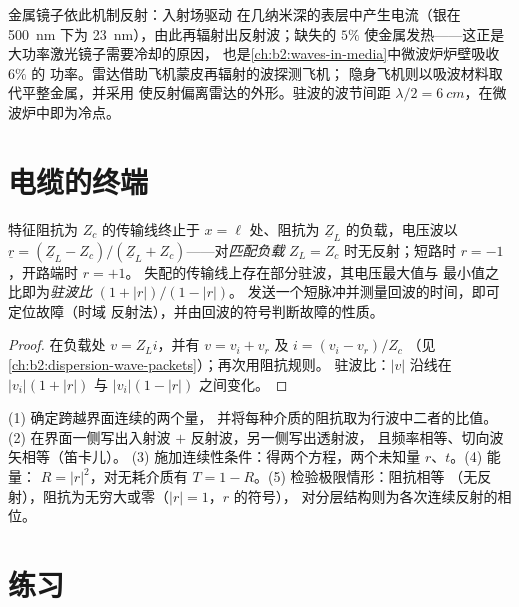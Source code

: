 \begin{example}[镜子、雷达与微波炉]\label{ex:b2:wave-interfaces:conductoruses}
金属镜子依此机制反射：入射场驱动
在几纳米深的表层中产生电流（银在
\qty{500}{nm} 下为 \qty{23}{nm}），由此再辐射出反射波；缺失的 $5\%$
使金属发热——这正是大功率激光镜子需要冷却的原因，
也是\cref{ch:b2:waves-in-media}中微波炉炉壁吸收 $6\%$ 的
功率。雷达借助飞机蒙皮再辐射的波探测飞机；
隐身飞机则以吸波材料取代平整金属，并采用
使反射偏离雷达的外形。驻波的波节间距 $\lambda/2 =
\qty{6}{cm}$，在微波炉中即为冷点。
\end{example}

\section{电缆的终端}

\begin{proposition}[传输线的终端]\label{prop:b2:wave-interfaces:coax}
特征阻抗为 $Z_c$ 的传输线终止于 $x = \ell$ 处、阻抗为
$\underline Z_L$ 的负载，电压波以 $\underline r =
(\underline Z_L - Z_c)/(\underline Z_L + Z_c)$——对\emph{匹配负载}
$Z_L = Z_c$ 时无反射；短路时 $r = -1$，开路端时 $r = +1$。
失配的传输线上存在部分驻波，其电压最大值与
最小值之比即为\emph{驻波比} $(1 + |r|)/(1 - |r|)$。
发送一个短脉冲并测量回波的时间，即可定位故障（时域
反射法），并由回波的符号判断故障的性质。
\end{proposition}

\begin{proof}
在负载处 $v = Z_Li$，并有 $v = v_i + v_r$ 及 $i = (v_i - v_r)/Z_c$
（见\cref{ch:b2:dispersion-wave-packets}）；再次用阻抗规则。
驻波比：$|v|$ 沿线在 $|v_i|(1 + |r|)$ 与 $|v_i|(1 -
|r|)$ 之间变化。
\end{proof}

\begin{method}[任意界面]\label{met:b2:wave-interfaces:method}
(1) 确定跨越界面连续的两个量，
并将每种介质的阻抗取为行波中二者的比值。
(2) 在界面一侧写出入射波 $+$ 反射波，另一侧写出透射波，
且频率相等、切向波矢相等（笛卡儿）。
(3) 施加连续性条件：得两个方程，两个未知量 $r$、$t$。(4) 能量：
$R = |r|^2$，对无耗介质有 $T = 1 - R$。(5) 检验极限情形：阻抗相等
（无反射），阻抗为无穷大或零（$|r| = 1$，$r$ 的符号），
对分层结构则为各次连续反射的相位。
\end{method}

\section{练习}


